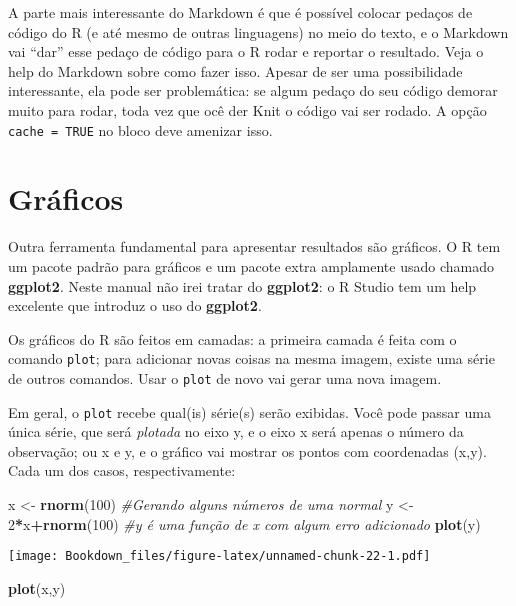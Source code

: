 \documentclass[
]{book}
\newenvironment{Shaded}{\begin{snugshade}}{\end{snugshade}}
\newcommand{\CommentTok}[1]{\textcolor[rgb]{0.56,0.35,0.01}{\textit{#1}}}
\newcommand{\DecValTok}[1]{\textcolor[rgb]{0.00,0.00,0.81}{#1}}
\newcommand{\KeywordTok}[1]{\textcolor[rgb]{0.13,0.29,0.53}{\textbf{#1}}}
\newcommand{\NormalTok}[1]{#1}
\newcommand{\OperatorTok}[1]{\textcolor[rgb]{0.81,0.36,0.00}{\textbf{#1}}}
\newcommand{\StringTok}[1]{\textcolor[rgb]{0.31,0.60,0.02}{#1}}
\begin{document}
A parte mais interessante do Markdown é que é possível colocar pedaços de código do R (e até mesmo de outras linguagens) no meio do texto, e o Markdown vai ``dar'' esse pedaço de código para o R rodar e reportar o resultado. Veja o help do Markdown sobre como fazer isso. Apesar de ser uma possibilidade interessante, ela pode ser problemática: se algum pedaço do seu código demorar muito para rodar, toda vez que ocê der Knit o código vai ser rodado. A opção \texttt{cache\ =\ TRUE} no bloco deve amenizar isso.

\hypertarget{gruxe1ficos}{%
\section{Gráficos}\label{gruxe1ficos}}

Outra ferramenta fundamental para apresentar resultados são gráficos. O R tem um pacote padrão para gráficos e um pacote extra amplamente usado chamado \textbf{ggplot2}. Neste manual não irei tratar do \textbf{ggplot2}: o R Studio tem um help excelente que introduz o uso do \textbf{ggplot2}.

Os gráficos do R são feitos em camadas: a primeira camada é feita com o comando \texttt{plot}; para adicionar novas coisas na mesma imagem, existe uma série de outros comandos. Usar o \texttt{plot} de novo vai gerar uma nova imagem.

Em geral, o \texttt{plot} recebe qual(is) série(s) serão exibidas. Você pode passar uma única série, que será \emph{plotada} no eixo y, e o eixo x será apenas o número da observação; ou x e y, e o gráfico vai mostrar os pontos com coordenadas (x,y). Cada um dos casos, respectivamente:

\begin{Shaded}
\begin{Highlighting}[]
\NormalTok{x \textless{}{-}}\StringTok{ }\KeywordTok{rnorm}\NormalTok{(}\DecValTok{100}\NormalTok{) }\CommentTok{\#Gerando alguns números de uma normal}
\NormalTok{y \textless{}{-}}\StringTok{ }\DecValTok{2}\OperatorTok{*}\NormalTok{x}\OperatorTok{+}\KeywordTok{rnorm}\NormalTok{(}\DecValTok{100}\NormalTok{) }\CommentTok{\#y é uma função de x com algum erro adicionado}
\KeywordTok{plot}\NormalTok{(y)}
\end{Highlighting}
\end{Shaded}

\texttt{[image: Bookdown\_files/figure-latex/unnamed-chunk-22-1.pdf]}

\begin{Shaded}
\begin{Highlighting}[]
\KeywordTok{plot}\NormalTok{(x,y)}
\end{Highlighting}
\end{Shaded}
\end{document}
